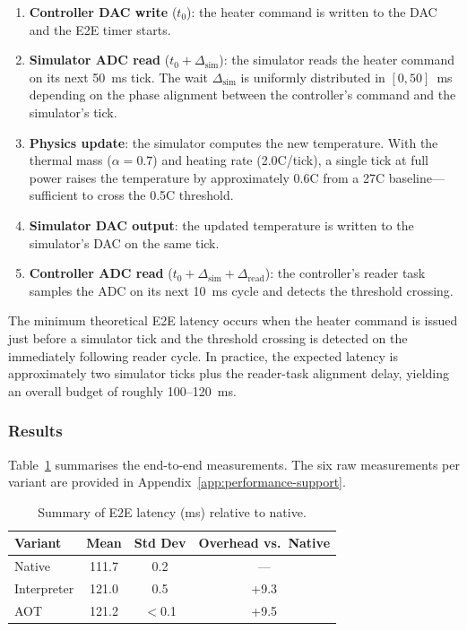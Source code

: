 \documentclass[12pt, a4paper]{report}
\begin{document}
\begin{enumerate}
    \item \textbf{Controller DAC write} ($t_0$): the heater command is written to the DAC and the E2E timer starts.
    \item \textbf{Simulator ADC read} ($t_0 + \Delta_{\text{sim}}$): the simulator reads the heater command on its next 50~ms tick. The wait $\Delta_{\text{sim}}$ is uniformly distributed in $[0, 50]$~ms depending on the phase alignment between the controller's command and the simulator's tick.
    \item \textbf{Physics update}: the simulator computes the new temperature. With the thermal mass ($\alpha = 0.7$) and heating rate (2.0\textdegree C/tick), a single tick at full power raises the temperature by approximately 0.6\textdegree C from a 27\textdegree C baseline---sufficient to cross the 0.5\textdegree C threshold.
    \item \textbf{Simulator DAC output}: the updated temperature is written to the simulator's DAC on the same tick.
    \item \textbf{Controller ADC read} ($t_0 + \Delta_{\text{sim}} + \Delta_{\text{read}}$): the controller's reader task samples the ADC on its next 10~ms cycle and detects the threshold crossing.
\end{enumerate}

The minimum theoretical E2E latency occurs when the heater command is issued just before a simulator tick and the threshold crossing is detected on the immediately following reader cycle. In practice, the expected latency is approximately two simulator ticks plus the reader-task alignment delay, yielding an overall budget of roughly 100--120~ms.

\subsubsection{Results}
\label{subsec:e2e-results}

Table~\ref{tab:e2e-summary} summarises the end-to-end measurements. The six raw measurements per variant are provided in Appendix~\ref{app:performance-support}.

\begin{table}[htbp]
\centering
\caption{Summary of E2E latency (ms) relative to native.}
\label{tab:e2e-summary}
\small
\begin{tabular}{@{}lccc@{}}
\toprule
\textbf{Variant} & \textbf{Mean} & \textbf{Std Dev} & \textbf{Overhead vs.\ Native} \\
\midrule
Native      & 111.7 & 0.2 & --- \\
Interpreter & 121.0 & 0.5 & +9.3 \\
AOT         & 121.2 & $<$0.1 & +9.5 \\
\bottomrule
\end{tabular}
\end{table}
\end{document}
